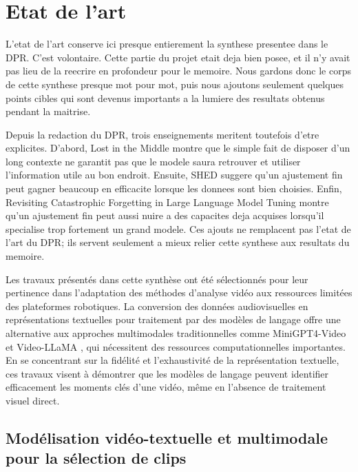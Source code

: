 \chapter{Etat de l'art}

L'etat de l'art conserve ici presque entierement la synthese presentee dans le DPR. C'est volontaire. Cette partie du projet etait deja bien posee, et il n'y avait pas lieu de la reecrire en profondeur pour le memoire. Nous gardons donc le corps de cette synthese presque mot pour mot, puis nous ajoutons seulement quelques points cibles qui sont devenus importants a la lumiere des resultats obtenus pendant la maitrise.

Depuis la redaction du DPR, trois enseignements meritent toutefois d'etre explicites. D'abord, Lost in the Middle \cite{liu2024_lost} montre que le simple fait de disposer d'un long contexte ne garantit pas que le modele saura retrouver et utiliser l'information utile au bon endroit. Ensuite, SHED \cite{he2024_shed} suggere qu'un ajustement fin peut gagner beaucoup en efficacite lorsque les donnees sont bien choisies. Enfin, Revisiting Catastrophic Forgetting in Large Language Model Tuning \cite{li2024_forgetting} montre qu'un ajustement fin peut aussi nuire a des capacites deja acquises lorsqu'il specialise trop fortement un grand modele. Ces ajouts ne remplacent pas l'etat de l'art du DPR; ils servent seulement a mieux relier cette synthese aux resultats du memoire.

Les travaux présentés dans cette synthèse ont été sélectionnés pour leur pertinence dans l'adaptation des méthodes d'analyse vidéo aux ressources limitées des plateformes robotiques. La conversion des données audiovisuelles en représentations textuelles pour traitement par des modèles de langage offre une alternative aux approches multimodales traditionnelles comme MiniGPT4-Video \cite{ataallah2024minigpt4video} et Video-LLaMA \cite{anonymous2023_videollama}, qui nécessitent des ressources computationnelles importantes. En se concentrant sur la fidélité et l'exhaustivité de la représentation textuelle, ces travaux visent à démontrer que les modèles de langage peuvent identifier efficacement les moments clés d'une vidéo, même en l'absence de traitement visuel direct.

\section{Modélisation vidéo-textuelle et multimodale pour la sélection de clips}

